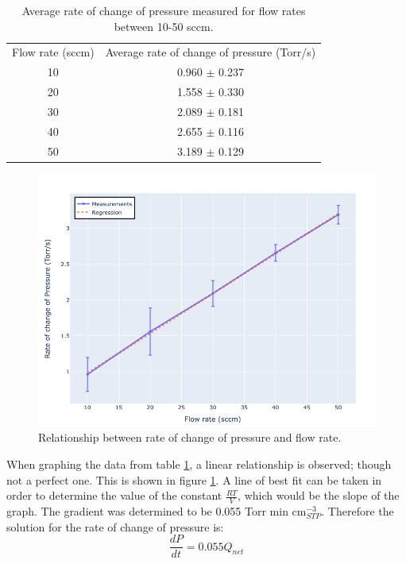 \begin{table}[]
\centering
\begin{tabular}{cc}
Flow rate (sccm) & Average rate of change of pressure (Torr/s) \\
10               & 0.960 $\pm$ 0.237                   \\
20               & 1.558 $\pm$ 0.330                   \\
30               & 2.089 $\pm$ 0.181                   \\
40               & 2.655 $\pm$ 0.116                   \\
50               & 3.189 $\pm$ 0.129                             
\end{tabular}
\caption{Average rate of change of pressure measured for flow rates between 10-50 sccm.}
\label{table:rate_of_change_of_pressure}
\end{table}

\begin{figure}[h!]
	\centering
	\includegraphics[width=\linewidth]{chapter_5/figures/gradient_rate_of_change_of_pressure.png}
	\caption{Relationship between rate of change of pressure and flow rate.}
	\label{fig:gradient_rate_of_change_of_pressure}
\end{figure}

When graphing the data from table \ref{table:rate_of_change_of_pressure}, a linear relationship is observed; though not a perfect one. This is shown in figure \ref{fig:gradient_rate_of_change_of_pressure}. A line of best fit can be taken in order to determine the value of the constant $\frac{RT}{V}$, which would be the slope of the graph. The gradient was determined to be 0.055 Torr min cm$_{STP}^{-3}$. Therefore the solution for the rate of change of pressure is:
\begin{equation}
    \frac{dP}{dt} = 0.055 Q_{net}
\end{equation}

